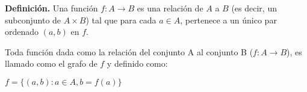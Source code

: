 
\noindent \textbf{Definición.}
\noindent Una función $f: A \to B$ es una relación de $A$ a $B$ (es decir, un subconjunto de $A \times B$) tal que para cada $a \in A$, pertenece a un único par ordenado $(a, b)$ en $f$.

Toda función dada como la relación del conjunto A al conjunto B ($f: A \to B$), es llamado como el grafo de $f$ y definido como:

\begingroup
    \centering $f = \lbrace(a,b) : a \in A, b = f(a)\rbrace$
\endgroup